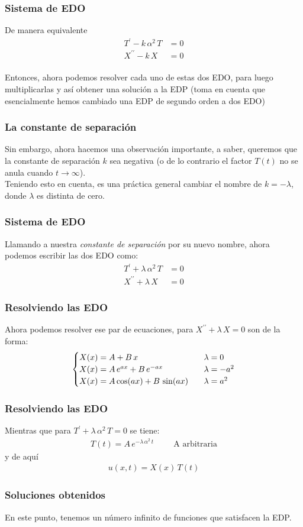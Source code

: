 \documentclass[12pt]{beamer}
\begin{document}
\begin{frame}
\frametitle{Sistema de EDO}
De manera equivalente
\begin{align*}
T^{\prime} - k \, \alpha^{2} \, T &= 0 \\[0.5em]
X^{\prime \prime} - k \, X &= 0
\end{align*}
\\
\bigskip
\pause
Entonces, ahora podemos resolver cada uno de estas dos EDO, para luego multiplicarlas y así obtener una solución a la EDP (toma en cuenta que esencialmente hemos cambiado una EDP de segundo orden a dos EDO)
\end{frame}
\begin{frame}
\frametitle{La constante de separación}
Sin embargo, ahora hacemos una observación importante, a saber, queremos que la constante de separación $k$ sea negativa (o de lo contrario el factor $T (t)$ no se anula cuando $t \to \infty$).
\\
\bigskip
Teniendo esto en cuenta, es una práctica general cambiar el nombre de $k = - \lambda$, donde $\lambda$ es distinta de cero.
\end{frame}
\begin{frame}
\frametitle{Sistema de EDO}
Llamando a nuestra \emph{constante de separación} por su nuevo nombre, ahora podemos escribir las dos EDO como:
\begin{align*}
T^{\prime} + \lambda \, \alpha^{2} \, T &= 0 \\[0.5em]
X^{\prime \prime} + \lambda \, X &= 0
\end{align*}
\end{frame}
\begin{frame}
\frametitle{Resolviendo las EDO}
Ahora podemos resolver ese par de ecuaciones, para $X^{\prime \prime} + \lambda \, X = 0$ son de la forma:
\begin{align}
\begin{cases}
X(x) = A + B \, x & \hspace{0.2cm} \lambda = 0 \\
X(x) = A \, e^{a x} + B \, e^{-a x} & \hspace{0.2cm} \lambda = - a^{2} \\
X(x) = A \cos (a x ) + B \, \sin (a x) & \hspace{0.2cm} \lambda = a^{2}
\end{cases}
\label{eq:ecuacion_06_02_31}
\end{align}
\end{frame}
\begin{frame}
\frametitle{Resolviendo las EDO}
Mientras que para $T^{\prime} + \lambda \, \alpha^{2} \, T = 0$ se tiene:
\begin{align}
T(t) = A \, e^{- \lambda \, \alpha^{2} \, t} \hspace{1cm} \mbox{A arbitraria}
\label{eq:ecuacion_06_02_36a}    
\end{align}
y de aquí
\begin{align*}
u(x, t) = X(x) \, T(t) 
\end{align*}
\end{frame}
\begin{frame}
\frametitle{Soluciones obtenidos}
En este punto, tenemos un número infinito de funciones que satisfacen la EDP.
\end{frame}
\end{document}
